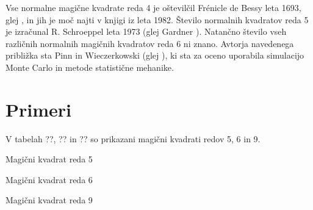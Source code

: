 \documentclass[a4paper,12pt]{article}
\theoremstyle{definition}
\theoremstyle{plain}
\theoremstyle{plain}
\begin{document}
Vse normalne magične kvadrate reda 4 je oštevilčil Frénicle de Bessy
leta 1693, glej \cite{bessy}, in jih je moč najti v knjigi \cite{berlekamp}
iz leta 1982. Število normalnih kvadratov reda 5 je izračunal
R. Schroeppel leta 1973 (glej Gardner \cite{gardner}).
Natančno število vseh različnih normalnih magičnih kvadratov reda 6 ni znano.
Avtorja navedenega približka sta Pinn in Wieczerkowski (glej \cite{pinn}), ki
sta za oceno uporabila simulacijo Monte Carlo in metode statistične mehanike.


\section{Primeri}

V tabelah ??, ?? in ?? so prikazani
magični kvadrati redov 5, 6 in 9.

Magični kvadrat reda 5

Magični kvadrat reda 6

Magični kvadrat reda 9



\end{document}
